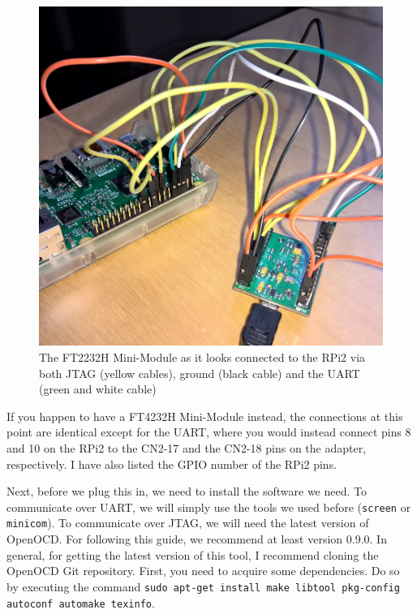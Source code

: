 \documentclass[a4paper,11pt,reqno]{amsart}
\begin{document}
\begin{figure}[hb]
\begin{center}
   \includegraphics[scale=0.3]{connection2.png}
 \end{center}
 \caption{The FT2232H Mini-Module as it looks connected to the RPi2 via both JTAG (yellow cables), ground (black cable) and the UART (green and white cable)}
 \label{fig:conn2}
\end{figure}

If you happen to have a FT4232H Mini-Module instead, the connections at this point are identical except for the UART, where you would instead connect pins 8 and 10 on the RPi2 to the CN2-17 and the CN2-18 pins on the adapter, respectively. I have also listed the GPIO number of the RPi2 pins.

Next, before we plug this in, we need to install the software we need. To communicate over UART, we will simply use the tools we used before (\texttt{screen} or \texttt{minicom}). To communicate over JTAG, we will need the latest version of OpenOCD. For following this guide, we recommend at least version 0.9.0. In general, for getting the latest version of this tool, I recommend cloning the OpenOCD Git repository. First, you need to acquire some dependencies. Do so by executing the command \texttt{sudo apt-get install make libtool pkg-config autoconf automake texinfo}.
\end{document}
